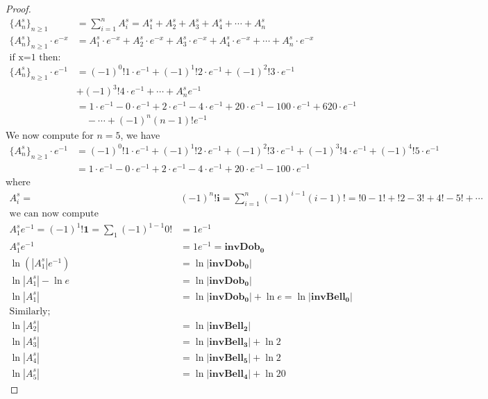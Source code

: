 \documentclass[pdflatex,sn-mathphys-num]{sn-jnl}%
\theoremstyle{thmstyleone}%
\theoremstyle{thmstyletwo}%
\theoremstyle{thmstylethree}%
\begin{document}
\begin{proof}
    \begin{align*}
   \lbrace A_n^s\rbrace_{n\geq 1}&=\sum_{i=1}^{n}A_i^s=A_1^s + A_2^s + A_3^s +A_4^s +\cdots + A_n^s\\
\lbrace A_n^s\rbrace_{n\geq 1}\cdotp e^{-x}&= A_1^s\cdotp e^{-x} + A_2^s \cdotp e^{-x}+ A_3^s \cdotp e^{-x}+A_4^s \cdotp e^{-x}+\cdots + A_n^s \cdotp e^{-x}\\ 
\mbox{if x=1 then:}\\
\lbrace A_n^s\rbrace_{n\geq 1}\cdotp e^{-1}&= (-1)^0 !1\cdotp e^{-1} + (-1)^1 !2\cdotp e^{-1} + (-1)^2 !3\cdotp e^{-1} \\
&+ (-1)^3 !4\cdotp e^{-1} +\cdots + A_n^s e^{-1}\\
&= 1\cdotp e^{-1} -  0\cdotp e^{-1} + 2\cdotp e^{-1} - 4\cdotp e^{-1} + 20\cdotp e^{-1} -100\cdotp e^{-1}+ 620\cdotp e^{-1}\\
&\quad -\cdots+(-1)^n(n-1)!e^{-1}
\end{align*}
We now compute for $n=5$,  we have  
\begin{align*}
    \lbrace A_n^s\rbrace_{n\geq 1}\cdotp e^{-1}&= (-1)^0 !1\cdotp e^{-1} + (-1)^1 !2\cdotp e^{-1} + (-1)^2 !3\cdotp e^{-1} + (-1)^3 !4\cdotp e^{-1} +(-1)^4 !5\cdotp e^{-1}\\
&= 1\cdotp e^{-1} -  0\cdotp e^{-1} + 2\cdotp e^{-1} - 4\cdotp e^{-1} + 20\cdotp e^{-1} -100\cdotp e^{-1}
\end{align*}
where 
\begin{align*}
A_i^s=&(-1)^n\mathbf{!i}=\sum_{i=1}^{n}(-1)^{i-1}(i-1)!= !0 - 1!+ !2 - 3! + 4!- 5!  + \cdots \\ \mbox{we can now compute}\\
 A_1^se^{-1}=(-1)^1\mathbf{!1}=\sum_{1}(-1)^{1-1}0!&= 1e^{-1}\\
 A_1^se^{-1}&=1e^{-1}=\mathbf{invDob_0}\\
 \ln{( |A_1^s|e^{-1})}&=\ln |\mathbf{invDob_0}|\\
  \ln{ |A_1^s|}-\ln{e}&=\ln |\mathbf{invDob_0}|\\
  \ln{| A_1^s|}&=\ln |\mathbf{invDob_0}|+\ln{e}=\ln |\mathbf{invBell_0}|\\
  \mbox{Similarly;}\\
\ln |A_2^s|&=\ln |\mathbf{invBell_2}|\\
\ln |A_3^s|&=\ln |\mathbf{invBell_3}|+ \ln2\\
\ln |A_4^s|&=\ln |\mathbf{invBell_5}| + \ln2\\
\ln |A_5^s|&=\ln |\mathbf{invBell_4}| + \ln20
\end{align*}

\end{proof}
\end{document}
